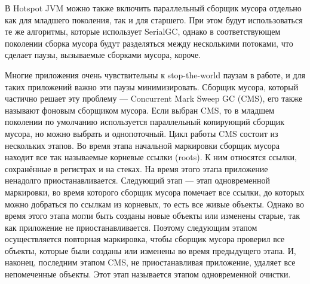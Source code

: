 В Hotspot JVM можно также включить параллельный сборщик мусора отдельно как для младшего поколения, 
так и для старшего. При этом будут использоваться те же алгоритмы, которые
использует SerialGC, однако в соответствующем поколении сборка мусора будут разделяться между несколькими 
потоками, что сделает паузы, вызываемые сборками мусора, короче.

Многие приложения очень чувствительны к stop-the-world паузам в работе, и для таких приложений
важно эти паузы минимизировать. Сборщик мусора, который частично решает эту проблему — 
Concurrent Mark Sweep GC (CMS), его также называют фоновым сборщиком мусора.
Если выбран CMS, то в младшем поколении по умолчанию используется параллельный копирующий
сборщик мусора, но можно выбрать и однопоточный. Цикл работы CMS состоит из нескольких этапов.
Во время этапа начальной маркировки сборщик мусора находит все так называемые 
корневые ссылки (roots). К ним относятся ссылки, сохранённые в регистрах и на стеках. На время
этого этапа приложение ненадолго приостанавливается. Следующий этап --- этап одновременной
маркировки, во время которого сборщик мусора помечает все ссылки, до которых 
можно добраться по ссылкам из корневых, то есть все живые объекты. Однако
во время этого этапа могли быть созданы новые объекты или изменены старые, так как приложение
не приостанавливается. Поэтому следующим этапом осуществляется повторная маркировка, чтобы
сборщик мусора проверил все объекты, которые были созданы или изменены во время предыдущего
этапа. И, наконец, последним этапом CMS, не приостанавливая приложение, удаляет все
непомеченные объекты. Этот этап называется этапом одновременной очистки.

